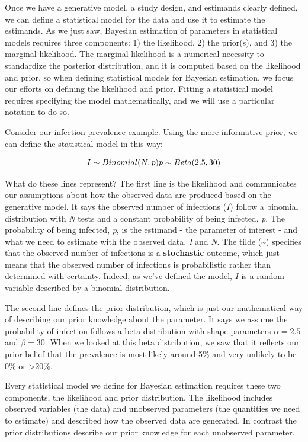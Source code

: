 \documentclass[
]{book}
\begin{document}
Once we have a generative model, a study design, and estimands clearly
defined, we can define a statistical model for the data and use it to
estimate the estimands. As we just saw, Bayesian estimation of
parameters in statistical models requires three components: 1) the
likelihood, 2) the prior(s), and 3) the marginal likelihood. The
marginal likelihood is a numerical necessity to standardize the
posterior distribution, and it is computed based on the likelihood and
prior, so when defining statistical models for Bayesian estimation, we
focus our efforts on defining the likelihood and prior. Fitting a
statistical model requires specifying the model mathematically, and we
will use a particular notation to do so.

Consider our infection prevalence example. Using the more informative
prior, we can define the statistical model in this way:

\[
I \sim Binomial(N, p) \\
p \sim Beta(2.5, 30)
\]

What do these lines represent? The first line is the likelihood and
communicates our assumptions about how the observed data are produced
based on the generative model. It says the observed number of infections
(\(I\)) follow a binomial distribution with \emph{N} tests and a constant
probability of being infected, \emph{p}. The probability of being infected,
\emph{p}, is the estimand - the parameter of interest - and what we need to
estimate with the observed data, \emph{I} and \emph{N}. The tilde (\textasciitilde) specifies that the observed number of infections is a \textbf{stochastic} outcome, which just means that the observed number of infections is probabilistic rather than determined with certainty. Indeed, as we've defined the model, \(I\) is a random variable described by a binomial distribution.

The second line defines the prior distribution, which is just our
mathematical way of describing our prior knowledge about the parameter.
It says we assume the probability of infection follows a beta
distribution with shape parameters \(\alpha = 2.5\) and \(\beta = 30\). When
we looked at this beta distribution, we saw that it reflects our prior
belief that the prevalence is most likely around 5\% and very unlikely to
be 0\% or \textgreater20\%.

Every statistical model we define for Bayesian estimation requires these
two components, the likelihood and prior distribution. The likelihood
includes observed variables (the data) and unobserved parameters (the
quantities we need to estimate) and described how the observed data are
generated. In contrast the prior distributions describe our prior
knowledge for each unobserved parameter.
\end{document}
